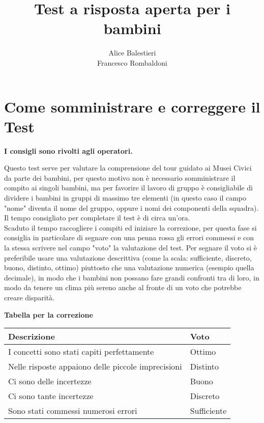 \documentclass[hidelinks,12pt,a4paper]{exam}
\begin{document}
	
	\title{\textbf{Test a risposta aperta per i bambini}}
	\author{Alice Balestieri\\Francesco Rombaldoni}
	\date{}
	\maketitle
	
	\newpage
	\pagestyle{plain}
	\tableofcontents
	\newpage
	
	\section{Come somministrare e correggere il Test}
	\begin{center}
		\textbf{I consigli sono rivolti agli operatori.}
	\end{center}
	
	Questo test serve per valutare la comprensione del tour guidato ai Musei Civici da parte dei bambini, per questo motivo non è necessario somministrare il compito ai singoli bambini, ma per favorire il lavoro di gruppo è consigliabile di dividere i bambini in gruppi di massimo tre elementi (in questo caso il campo "nome" diventa il nome del gruppo, oppure i nomi dei componenti della squadra). Il tempo consigliato per completare il test è di circa un'ora.\\
	Scaduto il tempo raccogliere i compiti ed iniziare la correzione, per questa fase si consiglia in particolare di segnare con una penna rossa gli errori commessi e con la stessa scrivere nel campo "voto" la valutazione del test. Per segnare il voto si è preferibile usare una valutazione descrittiva (come la scala: sufficiente, discreto, buono, distinto, ottimo) piuttosto che una valutazione numerica (esempio quella decimale), in modo che i bambini non possano fare grandi confronti tra di loro, in modo da tenere un clima più sereno anche al fronte di un voto che potrebbe creare disparità.\\
	
	\begin{center}
		\large{\textbf{Tabella per la correzione}}\\
		\bigskip
		
		\begin{tabularx}{0.5\textwidth} { 
				| >{\raggedright\arraybackslash}X 
				| >{\centering\arraybackslash}X | }
			\hline
			\textbf{Descrizione} & \textbf{Voto} \\
			\hline
			I concetti sono stati capiti perfettamente & Ottimo\\
			\hline
			Nelle risposte appaiono delle piccole imprecisioni & Distinto\\
			\hline
			Ci sono delle incertezze & Buono\\
			\hline
			Ci sono tante incertezze & Discreto\\
			\hline
			Sono stati commessi numerosi errori & Sufficiente\\
			\hline
		\end{tabularx}
	\end{center}
	
\end{document}
